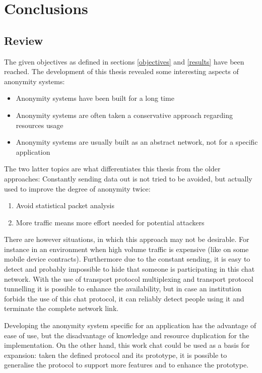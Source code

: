 \chapter{Conclusions}
\section{Review}
The given objectives as defined in sections
\ref{objectives} and \ref{results} have been reached. 
The development of this thesis revealed some interesting aspects
of anonymity systems:
\begin{itemize}
\item Anonymity systems have been built for a long time
\item Anonymity systems are often taken a conservative approach regarding resources usage
\item Anonymity systems are usually built as an abstract network, not for a specific application
\end{itemize}
The two latter topics are what differentiates this thesis from the older
approaches: Constantly sending data out is not tried to be avoided, but
actually used to improve the degree of anonymity twice:
\begin{enumerate}
\item Avoid statistical packet analysis
\item More traffic means more effort needed for potential attackers
\end{enumerate}
There are however situations, in which this approach may not be desirable.
For instance in an environment when high volume traffic is expensive
(like on some mobile device contracts).
Furthermore due to the constant sending, it is easy to detect and probably
impossible to hide that someone is participating in this chat network.
With the use of transport protocol multiplexing and transport protocol
tunnelling it is possible to enhance the availability, but in case an
institution forbids the use of this chat protocol, it can reliably
detect people using it and terminate the complete network link.

Developing the anonymity system specific for an application has the advantage
of ease of use, but the disadvantage of knowledge and resource duplication
for the implementation. On the other hand, this work
chat could be used as a basis for expansion: taken the
defined protocol and its prototype, it is possible to generalise
the protocol to support more features and to enhance the prototype.
